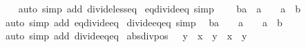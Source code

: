 \begin{isabellebody}
%
\isadelimproof
\ \ %
\endisadelimproof
%
\isatagproof
{}\isamarkupfalse%
\ {\isacharparenleft}{\kern0pt}auto\ simp\ add{\isacharcolon}{\kern0pt}\ divide{\isacharunderscore}{\kern0pt}less{\isacharunderscore}{\kern0pt}eq{\isacharparenright}{\kern0pt}%
\endisatagproof
{\isafoldproof}%
%
\isadelimproof
\isanewline
%
\endisadelimproof
\isanewline
{}\isamarkupfalse%
\ eq{\isacharunderscore}{\kern0pt}divide{\isacharunderscore}{\kern0pt}eq{\isacharunderscore}{\kern0pt}{}\ {\isacharbrackleft}{\kern0pt}simp{\isacharbrackright}{\kern0pt}{\isacharcolon}{\kern0pt}\isanewline
\ \ {\isachardoublequoteopen}{\isacharparenleft}{\kern0pt}{}\ {\isacharequal}{\kern0pt}\ b{\isacharslash}{\kern0pt}a{\isacharparenright}{\kern0pt}\ {\isacharequal}{\kern0pt}\ {\isacharparenleft}{\kern0pt}{\isacharparenleft}{\kern0pt}a\ {\isasymnoteq}\ {}\ {\isasymand}\ a\ {\isacharequal}{\kern0pt}\ b{\isacharparenright}{\kern0pt}{\isacharparenright}{\kern0pt}{\isachardoublequoteclose}\isanewline
%
\isadelimproof
\ \ %
\endisadelimproof
%
\isatagproof
{}\isamarkupfalse%
\ {\isacharparenleft}{\kern0pt}auto\ simp\ add{\isacharcolon}{\kern0pt}\ eq{\isacharunderscore}{\kern0pt}divide{\isacharunderscore}{\kern0pt}eq{\isacharparenright}{\kern0pt}%
\endisatagproof
{\isafoldproof}%
%
\isadelimproof
\isanewline
%
\endisadelimproof
\isanewline
{}\isamarkupfalse%
\ divide{\isacharunderscore}{\kern0pt}eq{\isacharunderscore}{\kern0pt}eq{\isacharunderscore}{\kern0pt}{}\ {\isacharbrackleft}{\kern0pt}simp{\isacharbrackright}{\kern0pt}{\isacharcolon}{\kern0pt}\isanewline
\ \ {\isachardoublequoteopen}{\isacharparenleft}{\kern0pt}b{\isacharslash}{\kern0pt}a\ {\isacharequal}{\kern0pt}\ {}{\isacharparenright}{\kern0pt}\ {\isacharequal}{\kern0pt}\ {\isacharparenleft}{\kern0pt}{\isacharparenleft}{\kern0pt}a\ {\isasymnoteq}\ {}\ {\isasymand}\ a\ {\isacharequal}{\kern0pt}\ b{\isacharparenright}{\kern0pt}{\isacharparenright}{\kern0pt}{\isachardoublequoteclose}\isanewline
%
\isadelimproof
\ \ %
\endisadelimproof
%
\isatagproof
{}\isamarkupfalse%
\ {\isacharparenleft}{\kern0pt}auto\ simp\ add{\isacharcolon}{\kern0pt}\ divide{\isacharunderscore}{\kern0pt}eq{\isacharunderscore}{\kern0pt}eq{\isacharparenright}{\kern0pt}%
\endisatagproof
{\isafoldproof}%
%
\isadelimproof
\isanewline
%
\endisadelimproof
\isanewline
{}\isamarkupfalse%
\ abs{\isacharunderscore}{\kern0pt}div{\isacharunderscore}{\kern0pt}pos{\isacharcolon}{\kern0pt}\ {\isachardoublequoteopen}{}\ {\isacharless}{\kern0pt}\ y\ {\isasymLongrightarrow}\ {\isasymbar}x{\isasymbar}\ {\isacharslash}{\kern0pt}\ y\ {\isacharequal}{\kern0pt}\ {\isasymbar}x\ {\isacharslash}{\kern0pt}\ y{\isasymbar}{\isachardoublequoteclose}\isanewline

\end{isabellebody}
